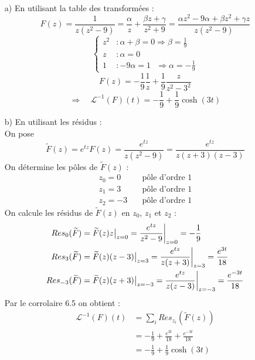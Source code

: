 \begin{itemize}
    \item[a)] En utilisant la table des transformées :
    $$F(z) = \frac{1}{z(z^2-9)} = \frac{\alpha}{z} + \frac{\beta z + \gamma}{z^2+9} = \frac{\alpha z^2 - 9 \alpha + \beta z^2 + \gamma z}{z(z^2-9)}$$
    $$
    \begin{cases}
        z^2 &: \alpha + \beta = 0 \Rightarrow \beta = \frac{1}{9} \\
        z &: \alpha = 0 \\
        1 &: -9 \alpha = 1 \text{ } \Rightarrow \alpha = -\frac{1}{9}
    \end{cases}
    $$
    $$F(z) = -\frac{1}{9} \frac{1}{z} + \frac{1}{9} \frac{z}{z^2-3^2}$$
    $$\Rightarrow \quad \mathcal{L}^{-1}(F)(t) = -\frac{1}{9} + \frac{1}{9} \cosh(3t)$$
    \item[b)] En utilisant les résidus : \\
    On pose
    $$\widetilde{F}(z) = e^{tz}F(z) = \frac{e^{tz}}{z(z^2-9)} = \frac{e^{tz}}{z(z+3)(z-3)}$$
    On détermine les pôles de $\widetilde{F}(z)$ :
    \begin{align*}
        z_0 = 0 \quad &\text{pôle d'ordre 1} \\
        z_1 = 3 \quad &\text{pôle d'ordre 1} \\
        z_2 = -3 \quad &\text{pôle d'ordre 1}
    \end{align*}
    On calcule les résidus de $\widetilde{F}(z)$ en $z_0$, $z_1$ et $z_2$ :
    \begin{align*}
        Res_0(\widetilde{F}) &= \widetilde{F}(z)z \big{|}_{z=0} = \frac{e^{tz}}{z^2-9} \bigg{|}_{z=0} = -\frac{1}{9} \\
        Res_3(\widetilde{F}) &= \widetilde{F}(z)(z-3) \big{|}_{z=3} = \frac{e^{tz}}{z(z+3)} \bigg{|}_{z=3} = \frac{e^{3t}}{18} \\
        Res_{-3}(\widetilde{F}) &= \widetilde{F}(z)(z+3) \big{|}_{z=-3} = \frac{e^{tz}}{z(z-3)} \bigg{|}_{z=-3} = \frac{e^{-3t}}{18}
    \end{align*}
    Par le corrolaire 6.5 on obtient :
    \begin{align*}
        \mathcal{L}^{-1}(F)(t) &= \sum_{i} Res_{z_i}(\widetilde{F}(z)) \\
        &= -\frac{1}{9} + \frac{e^{3t}}{18} + \frac{e^{-3t}}{18} \\
        &= -\frac{1}{9} + \frac{1}{9} \cosh(3t)
    \end{align*}
\end{itemize}